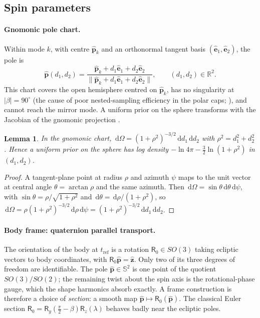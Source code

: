 \documentclass[11pt,a4paper]{article}
\newtheorem{lemma}{Lemma}
\theoremstyle{remark}
\newcommand{\uv}[1]{\hat{\bm{#1}}}
\newcommand{\R}{\mathbb{R}}
\newcommand{\Sph}{\mathbb{S}^2}
\newcommand{\dd}{\,\mathrm{d}}
\begin{document}
\subsection{Spin parameters}
\label{sec:spin}

\paragraph{Gnomonic pole chart.} Within mode $k$, with centre $\uv p_k$ and an orthonormal tangent basis
$(\uv e_1,\uv e_2)$, the pole is
\begin{equation}
  \uv p(d_1,d_2)=\frac{\uv p_k+d_1\uv e_1+d_2\uv e_2}{\lVert\uv p_k+d_1\uv e_1+d_2\uv e_2\rVert},
  \qquad(d_1,d_2)\in\R^2 .
\end{equation}
This chart covers the open hemisphere centred on $\uv p_k$, has no singularity at $|\beta|=90^\circ$ (the
cause of poor nested-sampling efficiency in the polar caps; \citealp{lcinv_convex2026}), and cannot
reach the mirror mode. A uniform prior on the sphere transforms with the Jacobian of the gnomonic
projection \citep{snyder1987}.

\begin{lemma}
In the gnomonic chart, $\dd\Omega=(1+\rho^2)^{-3/2}\dd d_1\dd d_2$ with $\rho^2=d_1^2+d_2^2$. Hence a
uniform prior on the sphere has log density $-\ln4\pi-\tfrac32\ln(1+\rho^2)$ in $(d_1,d_2)$.
\end{lemma}
\begin{proof}
A tangent-plane point at radius $\rho$ and azimuth $\psi$ maps to the unit vector at central angle
$\theta=\arctan\rho$ and the same azimuth. Then $\dd\Omega=\sin\theta\dd\theta\dd\psi$, with
$\sin\theta=\rho/\sqrt{1+\rho^2}$ and $\dd\theta=\dd\rho/(1+\rho^2)$, so
$\dd\Omega=\rho(1+\rho^2)^{-3/2}\dd\rho\dd\psi=(1+\rho^2)^{-3/2}\dd d_1\dd d_2$.
\end{proof}

\paragraph{Body frame: quaternion parallel transport.} The orientation of the body at $t_{\mathrm{ref}}$
is a rotation $\mathsf R_0\in SO(3)$ taking ecliptic vectors to body coordinates, with
$\mathsf R_0\uv p=\uv z$. Only two of its three degrees of freedom are identifiable. The pole
$\uv p\in\Sph$ is one point of the quotient $SO(3)/SO(2)$; the remaining twist about the spin axis is the
rotational-phase gauge, which the shape harmonics absorb exactly. A frame construction is therefore a
choice of \emph{section}: a smooth map $\uv p\mapsto\mathsf R_0(\uv p)$. The classical Euler section
$\mathsf R_0=\mathsf R_y(\tfrac\pi2-\beta)\mathsf R_z(\lambda)$ behaves badly near the ecliptic poles.
\end{document}
